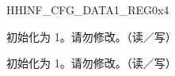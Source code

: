 \documentclass[sdio_slave.tex]{subfiles}
\begin{document}
\begin{register}{H}{HINF\_CFG\_DATA1\_REG}{0x4}\label{regdesc:HINFCFGDATA1REG}
%
%
%
\regnewline%
\begin{regdesc}\begin{reglist}
\item [HINF\_HIGHSPEED\_ENABLE] 初始化为 1。请勿修改。（读／写）
\item [HINF\_SDIO\_IOREADY1]初始化为 1。请勿修改。（读／写）
\end{reglist}\end{regdesc}
\end{register}
\end{document}

